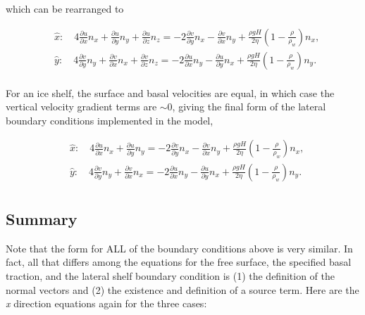 which can be rearranged to

\begin{align*}
  & \hat{x}:\quad 4\frac{\partial u}{\partial x}n_{x}+\frac{\partial u}{\partial y}n_{y}+\frac{\partial u}{\partial z}n_{z}=-2\frac{\partial v}{\partial y}n_{x}-\frac{\partial v}{\partial x}n_{y}+\frac{\rho gH}{2\eta }\left( 1-\frac{\rho }{\rho _{w}} \right)n_{x}, \\ 
 & \hat{y}:\quad 4\frac{\partial v}{\partial y}n_{y}+\frac{\partial v}{\partial x}n_{x}+\frac{\partial v}{\partial z}n_{z}=-2\frac{\partial u}{\partial x}n_{y}-\frac{\partial u}{\partial y}n_{x}+\frac{\rho gH}{2\eta }\left( 1-\frac{\rho }{\rho _{w}} \right)n_{y}. \\ 
\end{align*}

For an ice shelf, the surface and basal velocities are equal, in which case the vertical velocity gradient terms are $\sim{0}$, giving the final form of the lateral boundary conditions implemented in the model,

\begin{align*}
  & \hat{x}:\quad 4\frac{\partial u}{\partial x}n_{x}+\frac{\partial u}{\partial y}n_{y}=-2\frac{\partial v}{\partial y}n_{x}-\frac{\partial v}{\partial x}n_{y}+\frac{\rho gH}{2\eta }\left( 1-\frac{\rho }{\rho _{w}} \right)n_{x}, \\ 
 & \hat{y}:\quad 4\frac{\partial v}{\partial y}n_{y}+\frac{\partial v}{\partial x}n_{x}=-2\frac{\partial u}{\partial x}n_{y}-\frac{\partial u}{\partial y}n_{x}+\frac{\rho gH}{2\eta }\left( 1-\frac{\rho }{\rho _{w}} \right)n_{y}. \\ 
\end{align*}

\subsection{Summary}
Note that the form for ALL of the boundary conditions above is very similar. In fact, all that differs among the equations for the free surface, the specified basal traction, and the lateral shelf boundary condition is (1) the definition of the normal vectors and (2) the existence and definition of a source term. Here are the \textit{x} direction equations again for the three cases:

